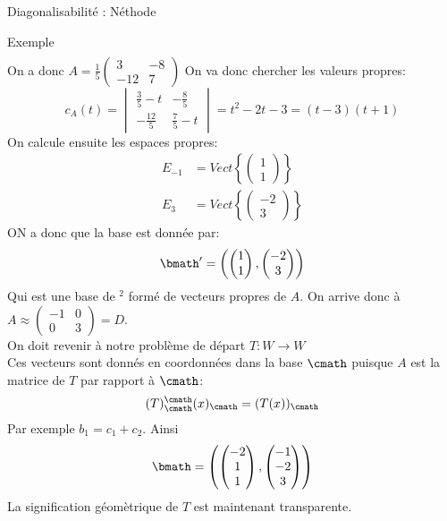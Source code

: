 \begin{parag}{Diagonalisabilité : Néthode}
\begin{subparag}{Exemple}
\begin{align*}
        \end{align*}
        On a donc $A = \frac{1}{5}\begin{pmatrix}
            3 & -8 \\ -12 & 7
        \end{pmatrix}$
        On va donc chercher les valeurs propres:
        \[c_A(t) = \begin{vmatrix}
            \frac{3}{5}-t & -\frac{8}{5}\\
            -\frac{12}{5} & \frac{7}{5} - t
        \end{vmatrix} = t^2 -2t -3 = (t-3)(t+1)\]
        On calcule ensuite les espaces propres:
        \begin{align*}
            E_{-1} &= Vect\left\{\begin{pmatrix}
                1 \\ 1
            \end{pmatrix}\right\}\\
            E_3 &= Vect\left\{\begin{pmatrix}
                -2 \\ 3
            \end{pmatrix}\right\}
        \end{align*}
        ON a donc que la base est donnée par:
        \[\bmath' = \left(\begin{pmatrix}
            1 \\ 1
        \end{pmatrix}, \begin{pmatrix}
            -2 \\ 3
        \end{pmatrix}\right)\]
        Qui est une base de \R$^2$ formé de vecteurs propres de $A$.
        On arrive donc à $A \approx \begin{pmatrix}
            -1 & 0 \\ 0 & 3
        \end{pmatrix} = D$.\\
        On doit revenir à notre problème de départ $T : W \to W$
        \\
        Ces vecteurs sont donnés en coordonnées dans la base $\cmath$ puisque $A$ est la matrice de $T$ par rapport à $\cmath$:
        \[(T)_\cmath^\cmath (x)_\cmath = (T(x))_\cmath\]
        Par exemple $b_1 = c_1 + c_2$. Ainsi
        \[\bmath = \left(\begin{pmatrix}
            -2 \\ 1 \\ 1
        \end{pmatrix}, \begin{pmatrix}
            -1 \\-2 \\ 3
        \end{pmatrix}\right)\]
        La signification géomètrique de $T$ est maintenant transparente.
    \end{subparag}
\end{parag}

